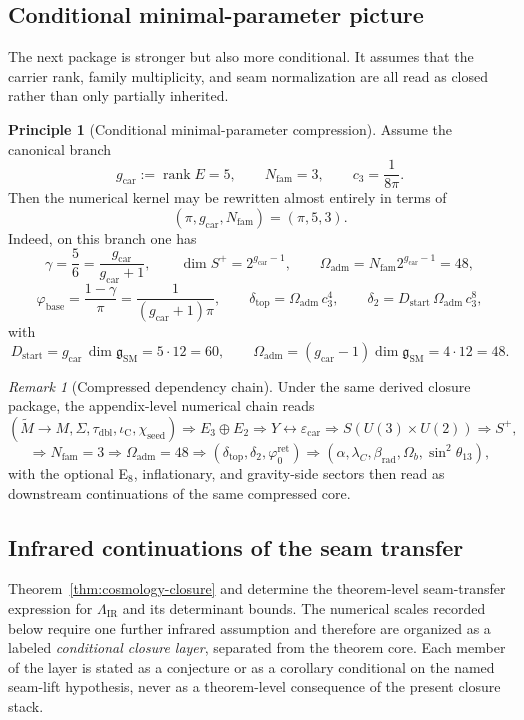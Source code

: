 \documentclass[11pt,a4paper]{article}
\theoremstyle{definition}
\newtheorem{principle}[theorem]{Principle}
\theoremstyle{remark}
\newtheorem*{remark}{Remark}
\DeclareMathOperator{\rank}{rank}
\newcommand{\Seam}{\Sigma}
\newcommand{\taudbl}{\tau_{\mathrm{dbl}}}
\newcommand{\iC}{\iota_{\mathrm C}}
\newcommand{\epscar}{\varepsilon_{\mathrm{car}}}
\newcommand{\cthree}{c_3}
\newcommand{\phibase}{\varphi_{\mathrm{base}}}
\newcommand{\phiz}{\varphi_0^{\mathrm{ret}}}
\newcommand{\deltatop}{\delta_{\mathrm{top}}}
\newcommand{\SM}{\mathrm{SM}}
\newcommand{\Oadm}{\Omega_{\mathrm{adm}}}
\newcommand{\gcar}{g_{\mathrm{car}}}
\newcommand{\chiseed}{\chi_{\mathrm{seed}}}
\newcommand{\Dstart}{D_{\mathrm{start}}}
\begin{document}
\subsection{Conditional minimal-parameter picture}

The next package is stronger but also more conditional. It assumes that the carrier rank, family multiplicity, and seam normalization are all read as closed rather than only partially inherited.

\begin{principle}[Conditional minimal-parameter compression]
Assume the canonical branch
\[
\gcar:=\rank E=5,
\qquad
N_{\mathrm{fam}}=3,
\qquad
\cthree=\frac{1}{8\pi}.
\]
Then the numerical kernel may be rewritten almost entirely in terms of
\[
(\pi,\gcar,N_{\mathrm{fam}})=(\pi,5,3).
\]
Indeed, on this branch one has
\[
\gamma=\frac56=\frac{\gcar}{\gcar+1},
\qquad
\dim S^+=2^{\gcar-1},
\qquad
\Oadm=N_{\mathrm{fam}}2^{\gcar-1}=48,
\]
\[
\phibase=\frac{1-\gamma}{\pi}=\frac{1}{(\gcar+1)\pi},
\qquad
\deltatop=\Oadm\,\cthree^4,
\qquad
\delta_2=\Dstart\,\Oadm\,\cthree^8,
\]
with
\[
\Dstart=\gcar\,\dim\mathfrak g_{\SM}=5\cdot 12=60,
\qquad
\Oadm=(\gcar-1)\dim\mathfrak g_{\SM}=4\cdot 12=48.
\]
\end{principle}

\begin{remark}[Compressed dependency chain]
Under the same derived closure package, the appendix-level numerical chain reads
\[
(\widetilde M\to M,\Seam,\taudbl,\iC,\chiseed)
\Longrightarrow
E_3\oplus E_2
\Longrightarrow
Y \leftrightarrow \epscar
\Longrightarrow
S(U(3)\times U(2))
\Longrightarrow
S^+,
\]
\[
\Longrightarrow
N_{\mathrm{fam}}=3
\Longrightarrow
\Oadm=48
\Longrightarrow
(\deltatop,\delta_2,\phiz)
\Longrightarrow
(\alpha,\lambda_C,\beta_{\mathrm{rad}},\Omega_b,\sin^2\theta_{13}),
\]
with the optional E$_8$, inflationary, and gravity-side sectors then read as downstream continuations of the same compressed core.
\end{remark}

\subsection{Infrared continuations of the seam transfer}
\label{app:ir-seam-continuations}

Theorem~\ref{thm:cosmology-closure} and  determine the
theorem-level seam-transfer expression for $\Lambda_{\mathrm{IR}}$ and its determinant bounds.
The numerical scales recorded below require one further infrared assumption and therefore are
organized as a labeled \emph{conditional closure layer}, separated from the theorem core. Each
member of the layer is stated as a conjecture or as a corollary conditional on the named seam-lift
hypothesis, never as a theorem-level consequence of the present closure stack.
\end{document}
